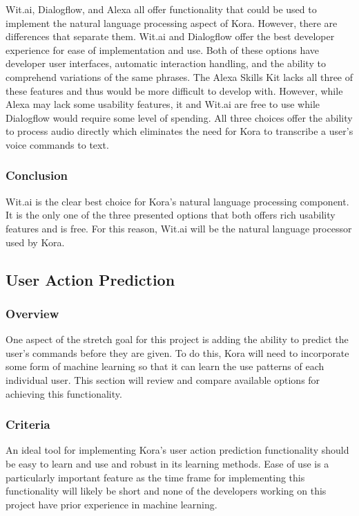 \documentclass[onecolumn, draftclsnofoot,10pt, compsoc]{IEEEtran}
\def \botname{Kora\xspace}
\begin{document}
	\noindent Wit.ai, Dialogflow, and Alexa all offer functionality that could be used to implement the natural language processing aspect of \botname.
	However, there are differences that separate them.
	Wit.ai and Dialogflow offer the best developer experience for ease of implementation and use.
	Both of these options have developer user interfaces, automatic interaction handling, and the ability to comprehend variations of the same phrases.
	The Alexa Skills Kit lacks all three of these features and thus would be more difficult to develop with.
	However, while Alexa may lack some usability features, it and Wit.ai are free to use while Dialogflow would require some level of spending.
	All three choices offer the ability to process audio directly which eliminates the need for \botname to transcribe a user's voice commands to text.

	\subsubsection{Conclusion}
	Wit.ai is the clear best choice for \botname's natural language processing component.
	It is the only one of the three presented options that both offers rich usability features and is free.
	For this reason, Wit.ai will be the natural language processor used by \botname.

	\subsection{User Action Prediction}
	\subsubsection{Overview}
	One aspect of the stretch goal for this project is adding the ability to predict the user's commands before they are given.
	To do this, \botname will need to incorporate some form of machine learning so that it can learn the use patterns of each individual user.
	This section will review and compare available options for achieving this functionality.
	\subsubsection{Criteria}
	An ideal tool for implementing \botname's user action prediction functionality should be easy to learn and use and robust in its learning methods.
	Ease of use is a particularly important feature as the time frame for implementing this functionality will likely be short and none of the developers working on this project have prior experience in machine learning.
\end{document}
